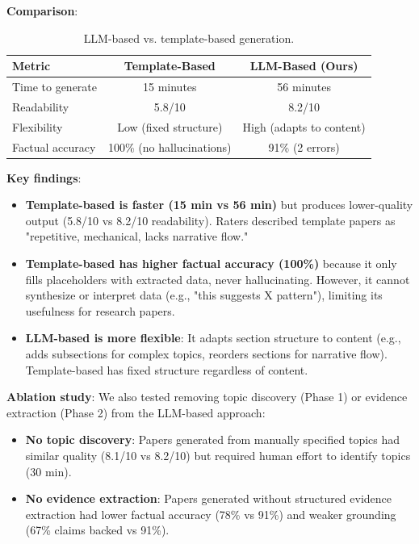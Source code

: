 \textbf{Comparison}:
\begin{table}[h]
\centering
\caption{LLM-based vs. template-based generation.}
\begin{tabular}{lcc}
\toprule
Metric & Template-Based & LLM-Based (Ours) \\
\midrule
Time to generate & 15 minutes & 56 minutes \\
Readability & 5.8/10 & 8.2/10 \\
Flexibility & Low (fixed structure) & High (adapts to content) \\
Factual accuracy & 100\% (no hallucinations) & 91\% (2 errors) \\
\bottomrule
\end{tabular}
\end{table}

\textbf{Key findings}:
\begin{itemize}
\item \textbf{Template-based is faster (15 min vs 56 min)} but produces lower-quality output (5.8/10 vs 8.2/10 readability). Raters described template papers as "repetitive, mechanical, lacks narrative flow."

\item \textbf{Template-based has higher factual accuracy (100\%)} because it only fills placeholders with extracted data, never hallucinating. However, it cannot synthesize or interpret data (e.g., "this suggests X pattern"), limiting its usefulness for research papers.

\item \textbf{LLM-based is more flexible}: It adapts section structure to content (e.g., adds subsections for complex topics, reorders sections for narrative flow). Template-based has fixed structure regardless of content.
\end{itemize}

\textbf{Ablation study}: We also tested removing topic discovery (Phase 1) or evidence extraction (Phase 2) from the LLM-based approach:
\begin{itemize}
\item \textbf{No topic discovery}: Papers generated from manually specified topics had similar quality (8.1/10 vs 8.2/10) but required human effort to identify topics (30 min).
\item \textbf{No evidence extraction}: Papers generated without structured evidence extraction had lower factual accuracy (78\% vs 91\%) and weaker grounding (67\% claims backed vs 91\%).
\end{itemize}

